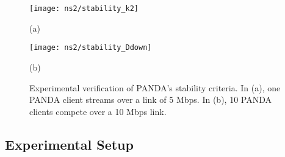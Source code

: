 \documentclass[conference]{IEEEtran}
\theoremstyle{plain}
\theoremstyle{definition}
\theoremstyle{plain}
\theoremstyle{plain}
\begin{document}
\begin{figure}
\begin{centering}
\begin{minipage}[t]{0.49\columnwidth}\begin{center}
\texttt{[image: ns2/stability\_k2]}
\par\end{center}

\begin{center}
\vspace{-0.1in}
(a) 
\par\end{center}

\begin{center}
\vspace{-0.15in}

\par\end{center}\end{minipage} \begin{minipage}[t]{0.49\columnwidth}\begin{center}
\texttt{[image: ns2/stability\_Ddown]}
\par\end{center}

\begin{center}
\vspace{-0.1in}
(b) 
\par\end{center}

\begin{center}
\vspace{-0.15in}

\par\end{center}\end{minipage}
\par\end{centering}

\vspace{-0.07in}
\caption{Experimental verification of PANDA's stability criteria. In (a), one
PANDA client streams over a link of 5 Mbps. In (b), 10 PANDA clients
compete over a 10 Mbps link.}


\label{Flo:panda_stability} \vspace{-0.05in}
\end{figure}



\subsection{Experimental Setup\label{sub:Experimental-Setup}}
\end{document}
